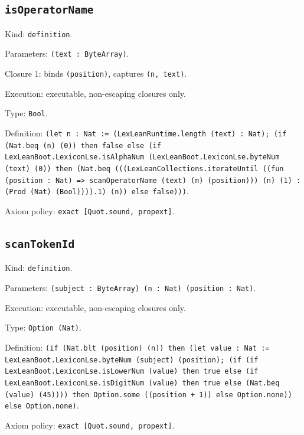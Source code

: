 \documentclass[11pt]{article}
\begin{document}
\subsection*{\texttt{isOperatorName}}
\noindent Kind: \texttt{definition}.\par
\noindent Parameters: \texttt{(text : ByteArray)}.\par
\noindent Closure 1: binds \texttt{(position)}, captures \texttt{(n, text)}.\par
\noindent Execution: executable, non-escaping closures only.\par
\noindent Type: \texttt{Bool}.\par
\noindent Definition: \texttt{(let n : Nat := (LexLeanRuntime.length (text) : Nat); (if (Nat.beq (n) (0)) then false else (if LexLeanBoot.LexiconLse.isAlphaNum (LexLeanBoot.LexiconLse.byteNum (text) (0)) then (Nat.beq (((LexLeanCollections.iterateUntil ((fun (position : Nat) => scanOperatorName (text) (n) (position))) (n) (1) : (Prod (Nat) (Bool)))).1) (n)) else false)))}.\par
\noindent Axiom policy: \texttt{exact [Quot.sound, propext]}.\par
\subsection*{\texttt{scanTokenId}}
\noindent Kind: \texttt{definition}.\par
\noindent Parameters: \texttt{(subject : ByteArray) (n : Nat) (position : Nat)}.\par
\noindent Execution: executable, non-escaping closures only.\par
\noindent Type: \texttt{Option (Nat)}.\par
\noindent Definition: \texttt{(if (Nat.blt (position) (n)) then (let value : Nat := LexLeanBoot.LexiconLse.byteNum (subject) (position); (if (if LexLeanBoot.LexiconLse.isLowerNum (value) then true else (if LexLeanBoot.LexiconLse.isDigitNum (value) then true else (Nat.beq (value) (45)))) then Option.some ((position + 1)) else Option.none)) else Option.none)}.\par
\noindent Axiom policy: \texttt{exact [Quot.sound, propext]}.\par
\end{document}
